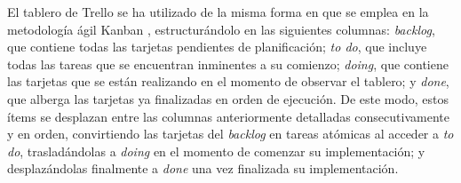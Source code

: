 El tablero de Trello se ha utilizado de la misma forma en que se emplea en la metodología ágil Kanban \cite{Met_TableroKanban}, estructurándolo en las siguientes columnas: \textit{backlog}, que contiene todas las tarjetas pendientes de planificación; \textit{to do}, que incluye todas las tareas que se encuentran inminentes a su comienzo; \textit{doing}, que contiene las tarjetas que se están realizando en el momento de observar el tablero; y \textit{done}, que alberga las tarjetas ya finalizadas en orden de ejecución. De este modo, estos ítems se desplazan entre las columnas anteriormente detalladas consecutivamente y en orden, convirtiendo las tarjetas del \textit{backlog} en tareas atómicas al acceder a \textit{to do}, trasladándolas a \textit{doing} en el momento de comenzar su implementación; y desplazándolas finalmente a \textit{done} una vez finalizada su implementación.
